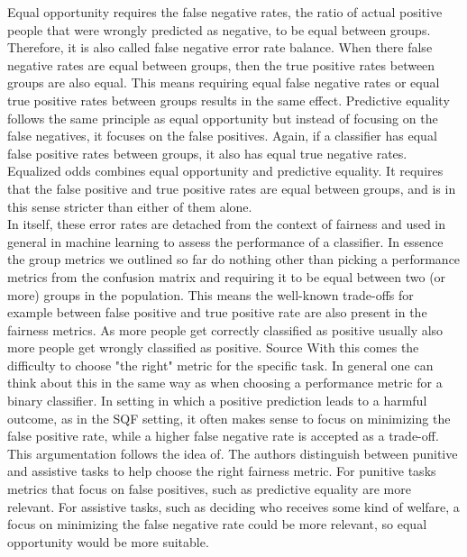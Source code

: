 Equal opportunity requires the false negative rates, the ratio of actual positive people that were wrongly predicted as negative, to be equal between groups.
Therefore, it is also called false negative error rate balance. When there false negative rates are equal between groups, then the true positive rates between groups are also equal.
This means requiring equal false negative rates or equal true positive rates between groups results in the same effect. Predictive equality follows the same principle as equal opportunity but instead of focusing on the false negatives, it focuses on the false positives. Again, if a classifier has equal false positive rates between groups, it also has equal true negative rates.
Equalized odds combines equal opportunity and predictive equality. It requires that the false positive and true positive rates are equal between groups, and is in this sense stricter than either of them alone. \\
In itself, these error rates are detached from the context of fairness and used in general in machine learning to assess the performance of a classifier. In essence the group metrics we outlined so far do nothing other than picking a performance metrics from the confusion matrix and requiring it to be equal between two (or more) groups in the population.
This means the well-known trade-offs for example between false positive and true positive rate are also present in the fairness metrics. As more people get correctly classified as positive usually also more people get wrongly classified as positive. {\color{red}Source}
With this comes the difficulty to choose "the right" metric for the specific task. In general one can think about this in the same way as when choosing a performance metric for a binary classifier.
In setting in which a positive prediction leads to a harmful outcome, as in the SQF setting, it often makes sense to focus on minimizing the false positive rate, while a higher false negative rate is accepted as a trade-off.
This argumentation follows the idea of. The authors distinguish between punitive and assistive tasks to help choose the right fairness metric. For punitive tasks metrics that focus on false positives, such as predictive equality are more relevant. For assistive tasks, such as deciding who receives some kind of welfare, a focus on minimizing the false negative rate could be more relevant, so equal opportunity would be more suitable.

